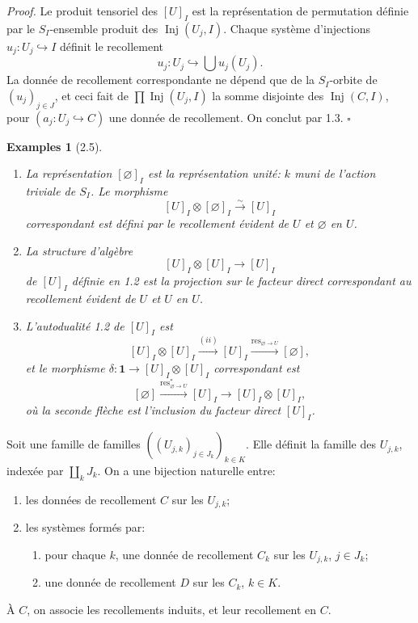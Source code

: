 \documentclass[11pt]{article}
\newcommand{\Inj}{\operatorname{Inj}}
\newcommand{\res}{\operatorname{res}}
\newcommand{\xto}[1]{\xrightarrow{#1}}
\theoremstyle{deligne}
\newtheorem*{examples*}{Examples}
\newenvironment{proofdel}{\textit{Proof.}}{\hfill$\square$}
\newcommand{\para}[1]{\vspace{0.65em}\noindent{\bfseries #1}\quad}
\begin{document}
\begin{proofdel}
Le produit tensoriel des \([U]_I\) est la représentation de permutation définie par le \(S_I\)-ensemble produit des \(\Inj(U_j,I)\). Chaque système d'injections \(u_j:U_j\hookrightarrow I\) définit le recollement
\[
  u_j:U_j\hookrightarrow \bigcup u_j(U_j).
\]
La donnée de recollement correspondante ne dépend que de la \(S_I\)-orbite de \((u_j)_{j\in J}\), et ceci fait de \(\prod \Inj(U_j,I)\) la somme disjointe des \(\Inj(C,I)\), pour \((a_j:U_j\hookrightarrow C)\) une donnée de recollement. On conclut par 1.3.
\end{proofdel}

\begin{examples*}[2.5]
\begin{enumerate}[label=(\roman*)]
\item La représentation \([\varnothing]_I\) est la représentation unité: \(k\) muni de l'action triviale de \(S_I\). Le morphisme
\[
  [U]_I\otimes[\varnothing]_I\overset{\sim}{\longrightarrow}[U]_I
\]
correspondant est défini par le recollement évident de \(U\) et \(\varnothing\) en \(U\).
\item La structure d'algèbre
\[
  [U]_I\otimes[U]_I\longrightarrow[U]_I
\]
de \([U]_I\) définie en 1.2 est la projection sur le facteur direct correspondant au recollement évident de \(U\) et \(U\) en \(U\).
\item L'autodualité 1.2 de \([U]_I\) est
\[
  [U]_I\otimes[U]_I \xto{(ii)} [U]_I \xto{\res_{\varnothing\to U}} [\varnothing],
\]
et le morphisme \(\delta:\mathbf 1\to[U]_I\otimes[U]_I\) correspondant est
\[
  [\varnothing]\xto{\res_{\varnothing\to U}^*}[U]_I
  \longrightarrow [U]_I\otimes[U]_I,
\]
où la seconde flèche est l'inclusion du facteur direct \([U]_I\).
\end{enumerate}
\end{examples*}

\para{2.6.}
Soit une famille de familles \(((U_{j,k})_{j\in J_k})_{k\in K}\). Elle définit la famille des \(U_{j,k}\), indexée par \(\coprod_k J_k\). On a une bijection naturelle entre:
\begin{enumerate}[label=(\Alph*)]
\item les données de recollement \(C\) sur les \(U_{j,k}\);
\item les systèmes formés par:
\begin{enumerate}[label=(\alph*)]
\item pour chaque \(k\), une donnée de recollement \(C_k\) sur les \(U_{j,k}\), \(j\in J_k\);
\item une donnée de recollement \(D\) sur les \(C_k\), \(k\in K\).
\end{enumerate}
\end{enumerate}
À \(C\), on associe les recollements induits, et leur recollement en \(C\).
\end{document}
